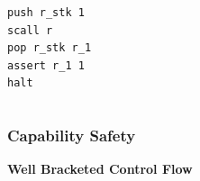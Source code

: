 \documentclass{beamer}
\begin{document}
\begin{frame}[fragile]
\begin{columns}[c]
\begin{center}
\begin{lstlisting}
push r_stk 1
scall r 
pop r_stk r_1
assert r_1 1
halt
\end{lstlisting}
\end{center}


\end{columns}
\end{frame}


\begin{frame}[fragile]
\frametitle{Capability Safety}
\textbf{Well Bracketed Control Flow}
\\[1cm]
\begin{columns}[c]


\end{columns}
\end{frame}
\end{document}
